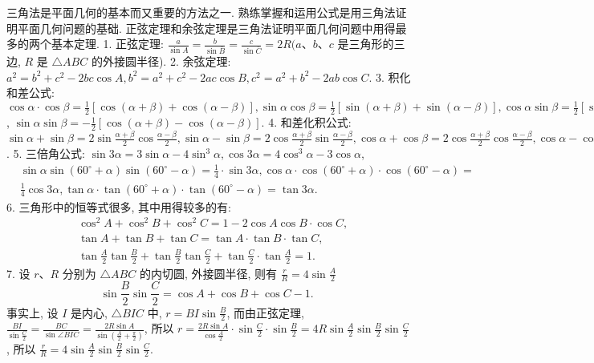 
三角法是平面几何的基本而又重要的方法之一.
熟练掌握和运用公式是用三角法证明平面几何问题的基础.
正弦定理和余弦定理是三角法证明平面几何问题中用得最多的两个基本定理.
1. 正弦定理: $\frac{a}{\sin A}=\frac{b}{\sin \bar{B}}=\frac{c}{\sin \bar{C}}=2 R(a 、 b 、 c$ 是三角形的三边, $R$ 是 $\triangle A B C$ 的外接圆半径).
2. 余弦定理: $a^2=b^2+c^2-2 b c \cos A, b^2=a^2+c^2-2 a c \cos B, c^2= a^2+b^2-2 a b \cos C$.
3. 积化和差公式: $\cos \alpha \cdot \cos \beta=\frac{1}{2}[\cos (\alpha+\beta)+\cos (\alpha-\beta)], \sin \alpha \cos \beta= \frac{1}{2}[\sin (\alpha+\beta)+\sin (\alpha-\beta)], \cos \alpha \sin \beta=\frac{1}{2}[\sin (\alpha+\beta)-\sin (\alpha-\beta)]$, $\sin \alpha \sin \beta=-\frac{1}{2}[\cos (\alpha+\beta)-\cos (\alpha-\beta)]$.
4. 和差化积公式: $\sin \alpha+\sin \beta=2 \sin \frac{\alpha+\beta}{2} \cos \frac{\alpha-\beta}{2}, \sin \alpha-\sin \beta= 2 \cos \frac{\alpha+\beta}{2} \sin \frac{\alpha-\beta}{2}, \cos \alpha+\cos \beta=2 \cos \frac{\alpha+\beta}{2} \cos \frac{\alpha-\beta}{2}, \cos \alpha-\cos \beta= -2 \sin \frac{\alpha+\beta}{2} \sin \frac{\alpha-\beta}{2}$.
5. 三倍角公式: $\sin 3 \alpha=3 \sin \alpha-4 \sin ^3 \alpha, \cos 3 \alpha=4 \cos ^3 \alpha-3 \cos \alpha$,
$$
\begin{aligned}
& \sin \alpha \sin \left(60^{\circ}+\alpha\right) \sin \left(60^{\circ}-\alpha\right)=\frac{1}{4} \cdot \sin 3 \alpha, \cos \alpha \cdot \cos \left(60^{\circ}+\alpha\right) \cdot \cos \left(60^{\circ}-\alpha\right)= \\
& \frac{1}{4} \cos 3 \alpha, \tan \alpha \cdot \tan \left(60^{\circ}+\alpha\right) \cdot \tan \left(60^{\circ}-\alpha\right)=\tan 3 \alpha .
\end{aligned}
$$
6. 三角形中的恒等式很多, 其中用得较多的有:
$$
\begin{aligned}
& \cos ^2 A+\cos ^2 B+\cos ^2 C=1-2 \cos A \cos B \cdot \cos C, \\
& \tan A+\tan B+\tan C=\tan A \cdot \tan B \cdot \tan C, \\
& \tan \frac{A}{2} \tan \frac{B}{2}+\tan \frac{B}{2} \tan \frac{C}{2}+\tan \frac{C}{2} \cdot \tan \frac{A}{2}=1 .
\end{aligned}
$$
7. 设 $r 、 R$ 分别为 $\triangle A B C$ 的内切圆, 外接圆半径, 则有 $\frac{r}{R}=4 \sin \frac{A}{2}$
$$
\sin \frac{B}{2} \sin \frac{C}{2}=\cos A+\cos B+\cos C-1 \text {. }
$$
事实上, 设 $I$ 是内心, $\triangle B I C$ 中, $r=B I \sin \frac{B}{2}$, 而由正弦定理, $\frac{B I}{\sin \frac{C}{2}}= \frac{B C}{\sin \angle B I C}=\frac{2 R \sin A}{\sin \left(\frac{A}{2}+\frac{\pi}{2}\right)}$, 所以 $r=\frac{2 R \sin A}{\cos \frac{A}{2}} \cdot \sin \frac{C}{2} \cdot \sin \frac{B}{2}=4 R \sin \frac{A}{2} \sin \frac{B}{2} \sin \frac{C}{2}$, 所以 $\frac{r}{R}=4 \sin \frac{A}{2} \sin \frac{B}{2} \sin \frac{C}{2}$.



